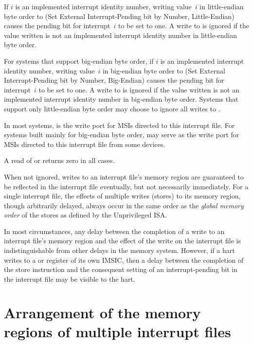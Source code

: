 If $i$ is an implemented interrupt identity number, writing value~$i$
in little-endian byte order to  (Set External
Interrupt-Pending bit by Number, Little-Endian) causes the pending bit
for interrupt~$i$ to be set to one.
A write to  is ignored if the value written is not an
implemented interrupt identity number in little-endian byte order.

For systems that support big-endian byte order, if $i$ is an
implemented interrupt identity number, writing value~$i$ in big-endian
byte order to  (Set External Interrupt-Pending bit by
Number, Big-Endian) causes the pending bit for interrupt~$i$ to be set
to one.
A write to  is ignored if the value written is not an
implemented interrupt identity number in big-endian byte order.
Systems that support only little-endian byte order may choose to ignore
all writes to .

In most systems,  is the write port for MSIs directed
to this interrupt file.
For systems built mainly for big-endian byte order, 
may serve as the write port for MSIs directed to this interrupt file
from some devices.

A read of  or  returns zero in all
cases.

When not ignored, writes to an interrupt file's memory region are
guaranteed to be reflected in the interrupt file eventually, but not
necessarily immediately.
For a single interrupt file, the effects of multiple writes (stores) to
its memory region, though arbitrarily delayed, always occur in the same
order as the \textit{global memory order} of the stores as defined by
the {\RISCV} Unprivileged ISA.

\begin{commentary}
In most circumstances, any delay between the completion of a write to
an interrupt file's memory region and the effect of the write on the
interrupt file is indistinguishable from other delays in the memory
system.
However, if a hart writes to a  or 
register of its own IMSIC, then a delay between the completion of the
store instruction and the consequent setting of an interrupt-pending
bit in the interrupt file may be visible to the hart.
\end{commentary}

\section{Arrangement of the memory regions of multiple interrupt files}
\label{sec:IMSIC-systemMemRegions}

